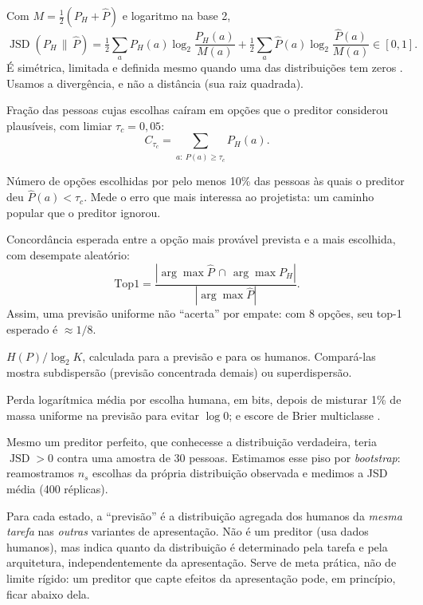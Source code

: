 \documentclass[12pt]{article}
\newcommand{\Ph}{P_H}
\newcommand{\Pp}{\hat{P}}
\DeclareMathOperator{\JSD}{JSD}
\begin{document}
\begin{description}[leftmargin=0.4cm,style=nextline]
\item[Divergência de Jensen--Shannon (métrica principal).] Com $M=\tfrac12(\Ph+\Pp)$ e logaritmo na base 2,
\begin{equation}
\JSD(\Ph \,\|\, \Pp) = \tfrac12 \sum_a \Ph(a)\log_2\frac{\Ph(a)}{M(a)} + \tfrac12 \sum_a \Pp(a)\log_2\frac{\Pp(a)}{M(a)} \in [0,1].
\end{equation}
É simétrica, limitada e definida mesmo quando uma das distribuições tem zeros \cite{lin1991jsd}. Usamos a divergência, e não a distância (sua raiz quadrada).
\item[Cobertura.] Fração das pessoas cujas escolhas caíram em opções que o preditor considerou plausíveis, com limiar $\tau_c = 0{,}05$:
\begin{equation}
C_{\tau_c} = \sum_{a:\ \Pp(a) \ge \tau_c} \Ph(a).
\end{equation}
\item[Opções omitidas.] Número de opções escolhidas por pelo menos 10\% das pessoas às quais o preditor deu $\Pp(a) < \tau_c$. Mede o erro que mais interessa ao projetista: um caminho popular que o preditor ignorou.
\item[Concordância top-1.] Concordância esperada entre a opção mais provável prevista e a mais escolhida, com desempate aleatório:
\begin{equation}
\text{Top1} = \frac{|\arg\max \Pp \,\cap\, \arg\max \Ph|}{|\arg\max \Pp|}.
\end{equation}
Assim, uma previsão uniforme não ``acerta'' por empate: com 8 opções, seu top-1 esperado é $\approx 1/8$.
\item[Entropia normalizada.] $H(P)/\log_2 K$, calculada para a previsão e para os humanos. Compará-las mostra subdispersão (previsão concentrada demais) ou superdispersão.
\item[\textit{Log-loss} e Brier (qualidade probabilística).] Perda logarítmica média por escolha humana, em bits, depois de misturar 1\% de massa uniforme na previsão para evitar $\log 0$; e escore de Brier multiclasse \cite{brier1950}.
\item[Piso amostral.] Mesmo um preditor perfeito, que conhecesse a distribuição verdadeira, teria $\JSD > 0$ contra uma amostra de 30 pessoas. Estimamos esse piso por \textit{bootstrap}: reamostramos $n_s$ escolhas da própria distribuição observada e medimos a JSD média (400 réplicas).
\item[Referência humana entre variantes.] Para cada estado, a ``previsão'' é a distribuição agregada dos humanos da \emph{mesma tarefa} nas \emph{outras} variantes de apresentação. Não é um preditor (usa dados humanos), mas indica quanto da distribuição é determinado pela tarefa e pela arquitetura, independentemente da apresentação. Serve de meta prática, não de limite rígido: um preditor que capte efeitos da apresentação pode, em princípio, ficar abaixo dela.

\end{description}
\end{document}
